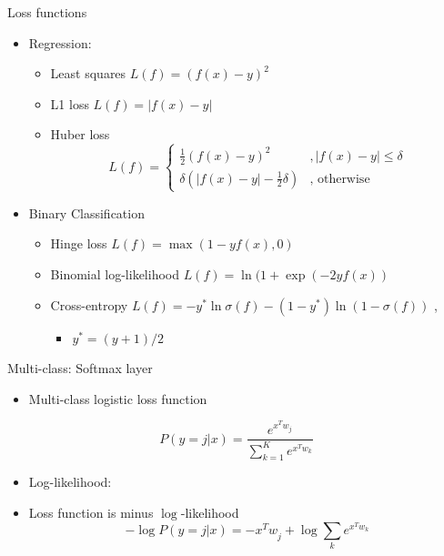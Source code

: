 \documentclass[12pt,notes,mathserif]{beamer}
\providecommand{\tightlist}{%
	\setlength{\itemsep}{0pt}\setlength{\parskip}{0pt}}
\begin{document}
\begin{frame}{Loss functions}

\begin{itemize}
\tightlist
\item
  Regression:

  \begin{itemize}
  \tightlist
  \item
    Least squares \(L(f)=(f(x)-y)^{2}\)
  \item
    L1 loss \(L(f)=|f(x)-y|\)
  \item
    Huber loss
    \[L({f})=\begin{cases} \frac{1}{2} (f(x)-y)^2 & , |f(x)-y| \le \delta \\ \delta (|f(x)-y| -\frac{1}{2} \delta ) & \textrm{, otherwise} \end{cases}\]
  \end{itemize}
\item
  Binary Classification

  \begin{itemize}
  \tightlist
  \item
    Hinge loss \(L(f)=\max(1-yf(x), 0)\)
  \item
    Binomial log-likelihood \(L(f)=\ln(1+\exp(-2yf(x))\)
  \item
    Cross-entropy
    \(L(f)=-y^{*}\ln \sigma(f)-(1-y^{*})\ln(1- \sigma(f))\) ,

    \begin{itemize}
    \tightlist
    \item
      \(y^{*}=(y+1)/2\)
    \end{itemize}
  \end{itemize}
\end{itemize}

\end{frame}

\begin{frame}{Multi-class: Softmax layer}

\begin{itemize}
\tightlist
\item
  Multi-class logistic loss function
\end{itemize}

\[P(y=j|x)=\frac{e^{x^Tw_j}}{\sum_{k=1}^{K}e^{x^Tw_k}}\]

\begin{itemize}
\tightlist
\item
  Log-likelihood:
\item
  Loss function is minus \(\log\)-likelihood \[
  -\log P(y=j|x)=-x^{T}w_{\dot{j}}+\log\sum_{k}e^{x^{T}w_{k}}
  \]
\end{itemize}

\end{frame}
\end{document}
